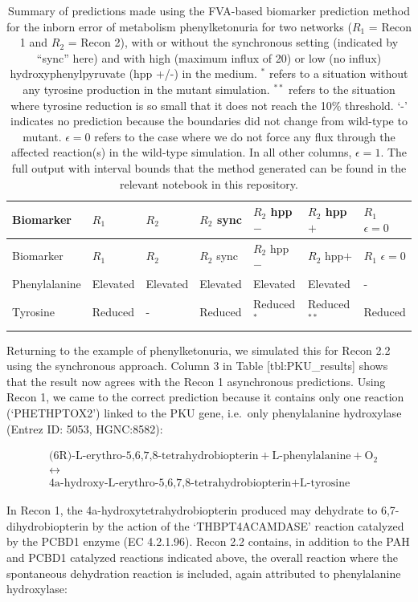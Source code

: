 \documentclass[10pt,a4paper,onecolumn]{article}
\begin{document}
\hypertarget{tbl:PKU_results}{}
\begin{longtable}[]{@{}lllllll@{}}
\caption{\label{tbl:PKU_results}Summary of predictions made using the
FVA-based biomarker prediction method for the inborn error of metabolism
phenylketonuria for two networks (\(R_1\) = Recon 1 and \(R_2\) = Recon
2), with or without the synchronous setting (indicated by ``sync'' here)
and with high (maximum influx of 20) or low (no influx)
hydroxyphenylpyruvate (hpp +/-) in the medium. \(^*\) refers to a
situation without any tyrosine production in the mutant simulation.
\(^{**}\) refers to the situation where tyrosine reduction is so small
that it does not reach the 10\% threshold. `-' indicates no prediction
because the boundaries did not change from wild-type to mutant.
\(\epsilon = 0\) refers to the case where we do not force any flux
through the affected reaction(s) in the wild-type simulation. In all
other columns, \(\epsilon = 1\). The full output with interval bounds
that the method generated can be found in the relevant notebook in this
repository. }\tabularnewline
\toprule
Biomarker & \(R_1\) & \(R_2\) & \(R_2\) sync & \(R_2\) hpp\(-\) &
\(R_2\) hpp\(+\) & \(R_1\) \(\epsilon = 0\)\tabularnewline
\midrule
\endfirsthead
\toprule
Biomarker & \(R_1\) & \(R_2\) & \(R_2\) sync & \(R_2\) hpp\(-\) &
\(R_2\) hpp\(+\) & \(R_1\) \(\epsilon = 0\)\tabularnewline
\midrule
\endhead
Phenylalanine & Elevated & Elevated & Elevated & Elevated & Elevated &
-\tabularnewline
Tyrosine & Reduced & - & Reduced & Reduced\(^*\) & Reduced\(^{**}\) &
Reduced\tabularnewline
\bottomrule
\end{longtable}

Returning to the example of phenylketonuria, we simulated this for Recon
2.2 using the synchronous approach. Column 3 in Table
{[}tbl:PKU\_results{]} shows that the result now agrees with the Recon 1
asynchronous predictions. Using Recon 1, we came to the correct
prediction because it contains only one reaction (`PHETHPTOX2') linked
to the PKU gene, i.e.~only phenylalanine hydroxylase (Entrez ID: 5053,
HGNC:8582):

\begin{align*}
&\text{(6R)-L-erythro-5,6,7,8-tetrahydrobiopterin} + \text{L-phenylalanine} + \text{O}_2 \\
&\leftrightarrow \\
&\text{4a-hydroxy-L-erythro-5,6,7,8-tetrahydrobiopterin} + \text{L-tyrosine}
\end{align*}

In Recon 1, the 4a-hydroxytetrahydrobiopterin produced may dehydrate to
6,7-dihydrobiopterin by the action of the `THBPT4ACAMDASE' reaction
catalyzed by the PCBD1 enzyme (EC 4.2.1.96). Recon 2.2 contains, in
addition to the PAH and PCBD1 catalyzed reactions indicated above, the
overall reaction where the spontaneous dehydration reaction is included,
again attributed to phenylalanine hydroxylase:
\end{document}
